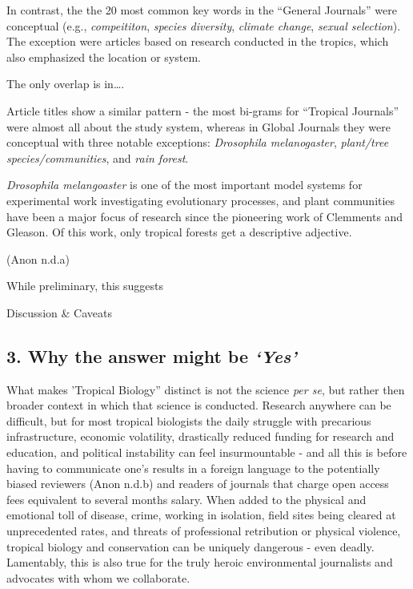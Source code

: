 \documentclass[
  12pt,
  man, donotrepeattitle]{apa6}
\begin{document}
In contrast, the the 20 most common key words in the ``General Journals'' were conceptual (e.g., \emph{compeititon}, \emph{species diversity}, \emph{climate change}, \emph{sexual selection}). The exception were articles based on research conducted in the tropics, which also emphasized the location or system.

The only overlap is in\ldots.

Article titles show a similar pattern - the most bi-grams for ``Tropical Journals'' were almost all about the study system, whereas in Global Journals they were conceptual with three notable exceptions: \emph{Drosophila melanogaster}, \emph{plant/tree species/communities}, and \emph{rain forest}.

\emph{Drosophila melangoaster} is one of the most important model systems for experimental work investigating evolutionary processes, and plant communities have been a major focus of research since the pioneering work of Clemments and Gleason. Of this work, only tropical forests get a descriptive adjective.

(Anon n.d.a)

While preliminary, this suggests

Discussion \& Caveats

\hypertarget{why-the-answer-might-be-yes}{%
\subsection{\texorpdfstring{3. Why the answer might be \emph{`Yes'}}{3. Why the answer might be `Yes'}}\label{why-the-answer-might-be-yes}}

What makes 'Tropical Biology'' distinct is not the science \emph{per se}, but rather then broader context in which that science is conducted. Research anywhere can be difficult, but for most tropical biologists the daily struggle with precarious infrastructure, economic volatility, drastically reduced funding for research and education, and political instability can feel insurmountable - and all this is before having to communicate one's results in a foreign language to the potentially biased reviewers (Anon n.d.b) and readers of journals that charge open access fees equivalent to several months salary. When added to the physical and emotional toll of disease, crime, working in isolation, field sites being cleared at unprecedented rates, and threats of professional retribution or physical violence, tropical biology and conservation can be uniquely dangerous - even deadly. Lamentably, this is also true for the truly heroic environmental journalists and advocates with whom we collaborate.
\end{document}
